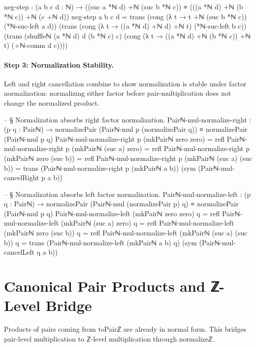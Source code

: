 \documentclass[11pt,a4paper]{book}
\def\texttt#1{#1}%
\begin{document}
\begin{code}
    neg-step : (a b c d : ℕ) →
      ((suc a *ℕ d) +ℕ (suc b *ℕ c))
        ≡
      (((a *ℕ d) +ℕ (b *ℕ c)) +ℕ (c +ℕ d))
    neg-step a b c d =
      trans
        (cong (λ t → t +ℕ (suc b *ℕ c)) (*ℕ-suc-left a d))
        (trans
          (cong (λ t → ((a *ℕ d) +ℕ d) +ℕ t) (*ℕ-suc-left b c))
          (trans
            (shuffleℕ (a *ℕ d) d (b *ℕ c) c)
            (cong (λ t → ((a *ℕ d) +ℕ (b *ℕ c)) +ℕ t) (+ℕ-comm d c))))
\end{code}

\paragraph{Step 3: Normalization Stability.}
Left and right cancellation combine to show normalization is stable under
factor normalization: normalizing either factor before pair-multiplication
does not change the normalized product.

\begin{code}
-- § Normalization absorbs right factor normalization.
Pairℕ-mul-normalize-right : (p q : Pairℕ) →
  normalizePair (Pairℕ-mul p (normalizePair q)) ≡ normalizePair (Pairℕ-mul p q)
Pairℕ-mul-normalize-right p (mkPairℕ zero zero) = refl
Pairℕ-mul-normalize-right p (mkPairℕ (suc a) zero) = refl
Pairℕ-mul-normalize-right p (mkPairℕ zero (suc b)) = refl
Pairℕ-mul-normalize-right p (mkPairℕ (suc a) (suc b)) =
  trans
    (Pairℕ-mul-normalize-right p (mkPairℕ a b))
    (sym (Pairℕ-mul-cancelRight p a b))

-- § Normalization absorbs left factor normalization.
Pairℕ-mul-normalize-left : (p q : Pairℕ) →
  normalizePair (Pairℕ-mul (normalizePair p) q) ≡ normalizePair (Pairℕ-mul p q)
Pairℕ-mul-normalize-left (mkPairℕ zero zero) q = refl
Pairℕ-mul-normalize-left (mkPairℕ (suc a) zero) q = refl
Pairℕ-mul-normalize-left (mkPairℕ zero (suc b)) q = refl
Pairℕ-mul-normalize-left (mkPairℕ (suc a) (suc b)) q =
  trans
    (Pairℕ-mul-normalize-left (mkPairℕ a b) q)
    (sym (Pairℕ-mul-cancelLeft q a b))
\end{code}

\section{Canonical Pair Products and ℤ-Level Bridge}

Products of pairs coming from \texttt{toPairℤ} are already in normal form. This bridges
pair-level multiplication to ℤ-level multiplication through \texttt{normalizeℤ}.
\end{document}
